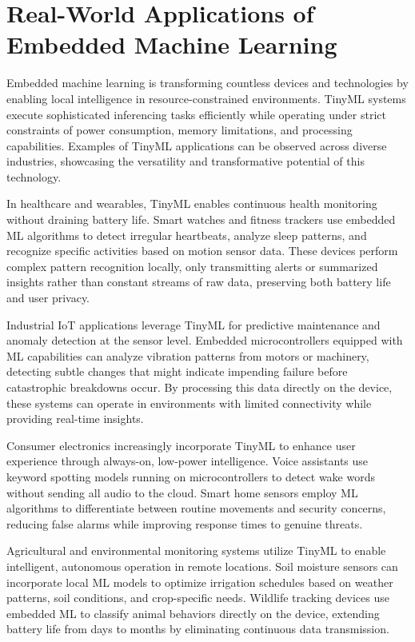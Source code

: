 \documentclass[
  9pt,
  letterpaper,
  abstract,
  titlepage]{scrbook}
\begin{document}
\section{Real-World Applications of Embedded Machine
Learning}\label{real-world-applications-of-embedded-machine-learning}

Embedded machine learning is transforming countless devices and
technologies by enabling local intelligence in resource-constrained
environments. TinyML systems execute sophisticated inferencing tasks
efficiently while operating under strict constraints of power
consumption, memory limitations, and processing capabilities. Examples
of TinyML applications can be observed across diverse industries,
showcasing the versatility and transformative potential of this
technology.

In healthcare and wearables, TinyML enables continuous health monitoring
without draining battery life. Smart watches and fitness trackers use
embedded ML algorithms to detect irregular heartbeats, analyze sleep
patterns, and recognize specific activities based on motion sensor data.
These devices perform complex pattern recognition locally, only
transmitting alerts or summarized insights rather than constant streams
of raw data, preserving both battery life and user privacy.

Industrial IoT applications leverage TinyML for predictive maintenance
and anomaly detection at the sensor level. Embedded microcontrollers
equipped with ML capabilities can analyze vibration patterns from motors
or machinery, detecting subtle changes that might indicate impending
failure before catastrophic breakdowns occur. By processing this data
directly on the device, these systems can operate in environments with
limited connectivity while providing real-time insights.

Consumer electronics increasingly incorporate TinyML to enhance user
experience through always-on, low-power intelligence. Voice assistants
use keyword spotting models running on microcontrollers to detect wake
words without sending all audio to the cloud. Smart home sensors employ
ML algorithms to differentiate between routine movements and security
concerns, reducing false alarms while improving response times to
genuine threats.

Agricultural and environmental monitoring systems utilize TinyML to
enable intelligent, autonomous operation in remote locations. Soil
moisture sensors can incorporate local ML models to optimize irrigation
schedules based on weather patterns, soil conditions, and crop-specific
needs. Wildlife tracking devices use embedded ML to classify animal
behaviors directly on the device, extending battery life from days to
months by eliminating continuous data transmission.
\end{document}
